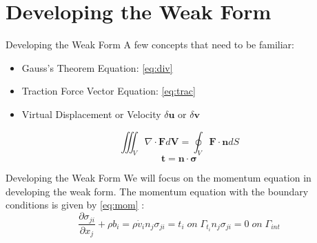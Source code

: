 \documentclass{beamer}
\begin{document}
\section{Developing the Weak Form}
\begin{frame}{Developing the Weak Form}
A few concepts that need to be familiar:
\begin{itemize}
	\item Gauss's Theorem Equation: \ref{eq:div}
	\item Traction Force Vector Equation: \ref{eq:trac}
	\item Virtual Displacement or Velocity $\delta\bm{u}$ or $\delta\bm{v}$
	\end{itemize}
\vspace{1cm}
	\begin{equation}
		\iiint_V\nabla\cdot\bm{F}d\bm{V}=\oint_V \bm{F}\cdot\bm{n}dS
		\label{eq:div}
	\end{equation}
	\begin{equation}
		\bm{t}=\bm{n}\cdot\bm{\sigma}
		\label{eq:trac}
	\end{equation}
\end{frame}

\begin{frame}{Developing the Weak Form}
	We will focus on the momentum equation in developing the weak form. The momentum equation with the boundary conditions is given by \ref{eq:mom} :
	\begin{subequations}
		\begin{equation}
			\frac{\partial \sigma_{ji}}{\partial x_{j}}+\rho b_{i}=\rho \dot{v}_{i}
		\end{equation}
		\begin{equation}
			n_{j}\sigma_{ji}=t_{i}\; on\; \Gamma_{t_{i}}
		\end{equation}
		\begin{equation}
			n_{j}\sigma_{ji}=0\; on\; \Gamma_{int}
		\end{equation}
		\label{eq:mom}
	\end{subequations}
\end{frame}
\end{document}
